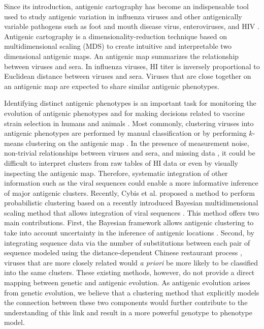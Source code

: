 \documentclass[11pt,oneside,letterpaper]{article}
\begin{document}
Since its introduction, antigenic cartography \cite{smith_mapping_2004, cai_computational_2010} has become an indispensable tool used to study antigenic variation in influenza viruses and other antigenically variable pathogens such as foot and mouth disease virus, enteroviruses, and HIV \cite{smith_mapping_2004, jong_antigenic_2007, ludi_antigenic_2014, debbink_withinhost_2014, frost_mapping_2013}.
Antigenic cartography is a dimensionality-reduction technique based on multidimensional scaling (MDS) to create intuitive and interpretable two dimensional antigenic maps. 
An antigenic map summarizes the relationship between viruses and sera.
In influenza viruses, HI titer is inversely proportional to Euclidean distance between viruses and sera.
Viruses that are close together on an antigenic map are expected to share similar antigenic phenotypes. 

Identifying distinct antigenic phenotypes is an important task for monitoring the evolution of antigenic phenotypes and for making decisions related to vaccine strain selection in humans and animals \cite{smith_mapping_2004, fouchier_use_2010}.
Most commonly, clustering viruses into antigenic phenotypes are performed by manual classification or by performing $k$-means clustering on the antigenic map \cite{smith_mapping_2004}. 
In the presence of measurement noise, non-trivial relationships between viruses and sera, and missing data \cite{cai_computational_2010}, it could be difficult to interpret clusters from raw tables of HI data or even by visually inspecting the antigenic map. 
Therefore, systematic integration of other information such as the viral sequences could enable a more informative inference of major antigenic clusters.
Recently, Cybis et al. \cite{cybis_bayesian_2015} proposed a method to perform probabilistic clustering based on a recently introduced Bayesian multidimensional scaling method \cite{oh_bayesian_2001} that allows integration of viral sequences \cite{bedford_integrating_2014}. 
This method offers two main contributions. 
First, the Bayesian framework allows antigenic clustering to take into account uncertainty in the inference of antigenic locations \cite{bedford_integrating_2014}.
Second, by integrating sequence data via the number of substitutions between each pair of sequence modeled using the distance-dependent Chinese restaurant process \cite{blei_distance_2011}, viruses that are more closely related would \textit{a priori} be more likely to be classified into the same clusters. 
These existing methods, however, do not provide a direct mapping between genetic and antigenic evolution. 
As antigenic evolution arises from genetic evolution, we believe that a clustering method that explicitly models the connection between these two components would further contribute to the understanding of this link and result in a more powerful genotype to phenotype model.
\end{document}
